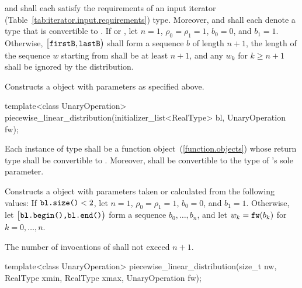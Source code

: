 \begin{itemdescr}
\pnum\requires
   and 
  shall each satisfy the requirements
  of an input iterator (Table~\ref{tab:iterator.input.requirements}) type.
  Moreover,
   and
  shall each denote a type that is convertible to .
 If 
 or ,
 let $ n = 1 $,
     $ \rho_0 = \rho_1 = 1 $,
     $ b_0 = 0 $,
 and $ b_1 = 1 $.
 Otherwise,
 $\bigl[\texttt{\protect firstB}, \texttt{\protect lastB}\bigr)$
 shall form a sequence $b$ of length $n+1$,
 the length of the sequence $w$ starting from 
 shall be at least $n+1$,
 and any $w_k$ for  $k \geq n+1$ shall be ignored by the distribution.

\pnum\effects Constructs a  object
 with parameters as specified above.
\end{itemdescr}


%
\begin{itemdecl}
template<class UnaryOperation>
 piecewise_linear_distribution(initializer_list<RealType> bl, UnaryOperation fw);
\end{itemdecl}

\begin{itemdescr}
\pnum\requires
 Each instance of type 
 shall be a function object~(\ref{function.objects})
 whose return type shall be convertible to .
 Moreover,
  shall be convertible
 to the type of 's sole parameter.

\pnum\effects Constructs a  object
 with parameters taken or calculated
 from the following values:
 If $\texttt{\protect bl.size()} < 2$,
 let $n = 1$,
     $ \rho_0 = \rho_1 = 1 $,
     $ b_0 = 0 $,
 and $ b_1 = 1 $.
 Otherwise,
 let $\bigl[\texttt{\protect bl.begin(),} \texttt{\protect bl.end()}\bigr)$
 form a sequence $ b_0, \ldots, b_n $,
 and
 let $ w_k = \texttt{\protect fw}(b_k) $
 for $ k = 0, \ldots, n $.

\pnum\complexity
 The number of invocations of  shall not exceed $n+1$.
\end{itemdescr}


%
\begin{itemdecl}
template<class UnaryOperation>
 piecewise_linear_distribution(size_t nw, RealType xmin, RealType xmax, UnaryOperation fw);
\end{itemdecl}

